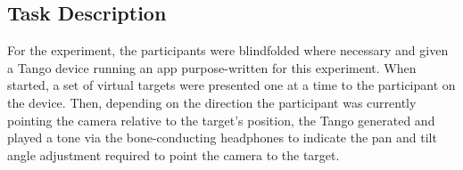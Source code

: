 \documentclass[sigconf, screen=true, anonymous=true]{acmart}
\begin{document}




\subsection{Task Description}


For the experiment, the participants were blindfolded where necessary and given a Tango device running an app purpose-written for this experiment.
When started, a set of virtual targets were presented one at a time to the participant on the device.
Then, depending on the direction the participant was currently pointing the camera relative to the target's position, the Tango generated and played a tone via the bone-conducting headphones to indicate the pan and tilt angle adjustment required to point the camera to the target. %
\end{document}
